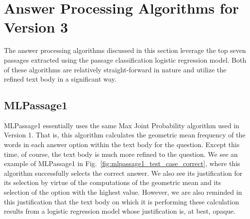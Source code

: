 \section{Answer Processing Algorithms for Version 3}

The answer processing algorithms discussed in this section leverage the top seven passages extracted using the passage classification logistic regression model.  Both of these algorithms are relatively straight-forward in nature and utilize the refined text body in a significant way.  




		

		
\subsection{MLPassage1}

MLPassage1 essentially uses the same Max Joint Probability algorithm used in Version 1.  That is, this algorithm calculates the geometric mean frequency of the words in each answer option within the text body for the question.  Except this time, of course, the text body is much more refined to the question.  We see an example of MLPassage1 in Fig.~\ref{fig:mlpassage1_test_case_correct}, where this algorithm successfully selects the correct answer.  We also see its justification for its selection by virtue of the computations of the geometric mean and its selection of the option with the highest value.  However, we are also reminded in this justification that the text body on which it is performing these calculation results from a logistic regression model whose justification is, at best, opaque.  



